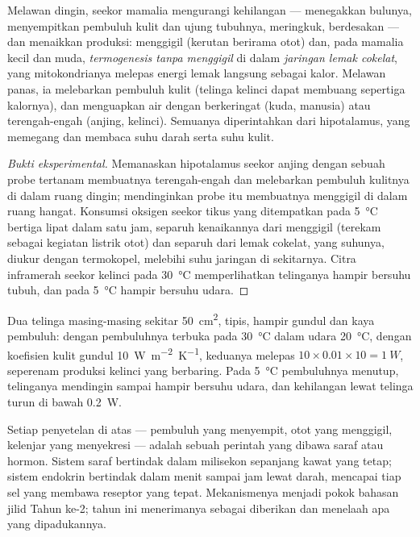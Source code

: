 \begin{proposition}\label{prop:b1:mammal-organization:thermoreg}
Melawan dingin, seekor mamalia mengurangi kehilangan --- menegakkan
bulunya, menyempitkan pembuluh kulit dan ujung tubuhnya, meringkuk,
berdesakan --- dan menaikkan produksi: menggigil (kerutan berirama otot)
dan, pada mamalia kecil dan muda, \emph{termogenesis tanpa
menggigil} di dalam \emph{jaringan
lemak cokelat}, yang mitokondrianya
melepas energi lemak langsung sebagai kalor. Melawan panas, ia
melebarkan pembuluh kulit (telinga kelinci dapat membuang sepertiga
kalornya), dan menguapkan air dengan berkeringat (kuda, manusia) atau
terengah-engah (anjing, kelinci). Semuanya diperintahkan dari
hipotalamus, yang memegang  dan membaca suhu darah serta
suhu kulit.
\end{proposition}
\begin{proof}[Bukti eksperimental]
Memanaskan hipotalamus seekor anjing dengan sebuah probe tertanam
membuatnya terengah-engah dan melebarkan pembuluh kulitnya di dalam
ruang dingin; mendinginkan probe itu membuatnya menggigil di dalam ruang
hangat. Konsumsi oksigen seekor tikus yang ditempatkan pada
\qty{5}{\celsius} bertiga lipat dalam satu jam, separuh kenaikannya dari
menggigil (terekam sebagai kegiatan listrik otot) dan separuh dari lemak
cokelat, yang suhunya, diukur dengan termokopel, melebihi suhu jaringan
di sekitarnya. Citra inframerah seekor kelinci pada \qty{30}{\celsius}
memperlihatkan telinganya hampir bersuhu tubuh, dan pada
\qty{5}{\celsius} hampir bersuhu udara.
\end{proof}

\begin{example}\label{ex:b1:mammal-organization:ears}
Dua telinga masing-masing sekitar \qty{50}{cm^2}, tipis, hampir
gundul dan kaya pembuluh: dengan pembuluhnya terbuka pada
\qty{30}{\celsius} dalam udara \qty{20}{\celsius}, dengan koefisien
kulit gundul \qty{10}{W.m^{-2}.K^{-1}}, keduanya melepas
$10\times 0.01\times 10 =
\qty{1}{W}$, seperenam produksi kelinci yang berbaring. Pada
\qty{5}{\celsius} pembuluhnya menutup, telinganya mendingin sampai
hampir bersuhu udara, dan kehilangan lewat telinga turun di bawah
\qty{0.2}{W}.
\end{example}

\begin{remark}[Pemaduan]\label{rem:b1:mammal-organization:coordination}
Setiap penyetelan di atas --- pembuluh yang menyempit, otot yang
menggigil, kelenjar yang menyekresi --- adalah sebuah perintah yang
dibawa saraf atau hormon. Sistem saraf bertindak dalam milisekon
sepanjang kawat yang tetap; sistem endokrin bertindak dalam menit sampai
jam lewat darah, mencapai tiap sel yang membawa reseptor yang tepat.
Mekanismenya menjadi pokok bahasan jilid Tahun ke-2; tahun ini
menerimanya sebagai diberikan dan menelaah apa yang dipadukannya.
\end{remark}

